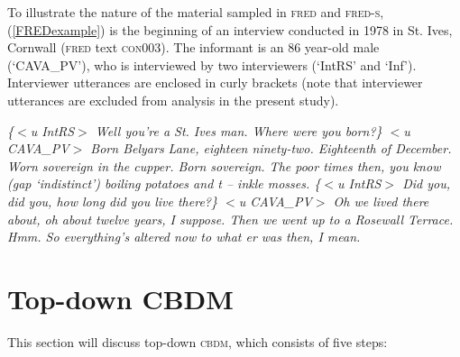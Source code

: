 \documentclass[output=paper]{LSP/langsci}
\begin{document}
To illustrate the nature of the material sampled in \textsc{fred} and \textsc{fred-s}, (\ref{FREDexample}) is the beginning of an interview conducted in 1978 in St. Ives, Cornwall (\textsc{fred} text \textsc{con}003). The informant is an 86 year-old male (`CAVA\_PV'), who is interviewed by two interviewers (`IntRS' and `Inf'). Interviewer utterances are enclosed in curly brackets (note that interviewer utterances are excluded from analysis in the present study).

\newpage
\begin{exe}
\ex \label{FREDexample} \textit{\{$<$u IntRS$>$ Well you're a St. Ives man. Where were you born?\}
\newline$<$u CAVA\_PV$>$ Born Belyars Lane, eighteen ninety-two. Eighteenth of December. Worn sovereign in the cupper. Born sovereign. The poor times then, you know (gap `indistinct') boiling potatoes and t -- inkle mosses.
\newline\{$<$u IntRS$>$ Did you, did you, how long did you live there?\}
\newline$<$u CAVA\_PV$>$ Oh we lived there about, oh about twelve years, I suppose. Then we went up to a Rosewall Terrace. Hmm. So everything's altered now to what er was then, I mean.}
\end{exe}

\section{Top-down CBDM} \label{topdown}

This section will discuss top-down \textsc{cbdm}, which consists of five steps:
\end{document}
